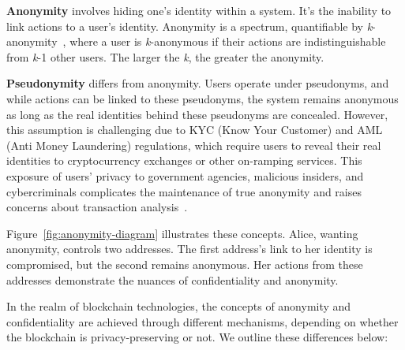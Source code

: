 \documentclass[pdftex,twocolumn,epjc3]{svjour3}
\begin{document}
\textbf{Anonymity} involves hiding one's identity within a system. It's the inability to link actions to a user's identity. Anonymity is a spectrum, quantifiable by \textit{k}-anonymity~\cite{sweeneyKanonymityModelProtecting2002}, where a user is \textit{k}-anonymous if their actions are indistinguishable from \textit{k}-1 other users. The larger the \textit{k}, the greater the anonymity.

\begin{sloppypar}
\textbf{Pseudonymity} differs from anonymity. Users operate under pseudonyms, and while actions can be linked to these pseudonyms, the system remains anonymous as long as the real identities behind these pseudonyms are concealed. However, this assumption is challenging due to KYC (Know Your Customer) and AML (Anti Money Laundering) regulations, which require users to reveal their real identities to cryptocurrency exchanges or other on-ramping services. This exposure of users' privacy to government agencies, malicious insiders, and cybercriminals complicates the maintenance of true anonymity and raises concerns about transaction analysis~\cite{androulakiEvaluatingUserPrivacy2013, oberStructureAnonymityBitcoin2013}.

Figure~\ref{fig:anonymity-diagram} illustrates these concepts. Alice, wanting anonymity, controls two addresses. The first address's link to her identity is compromised, but the second remains anonymous. Her actions from these addresses demonstrate the nuances of confidentiality and anonymity.
\end{sloppypar}

In the realm of blockchain technologies, the concepts of anonymity and confidentiality are achieved through different mechanisms, depending on whether the blockchain is privacy-preserving or not. We outline these differences below:
\end{document}
